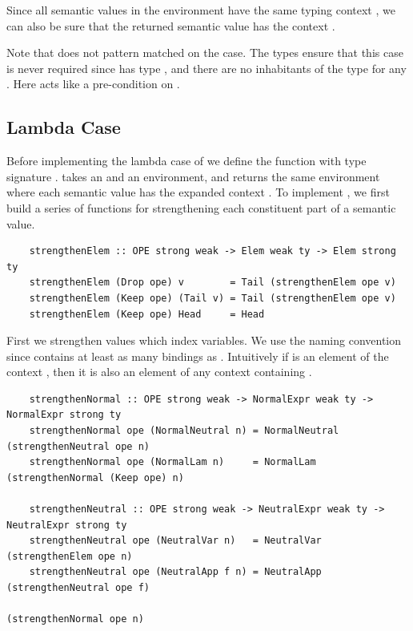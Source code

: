 Since all semantic values in the environment have the same typing context , we can also be sure that the returned semantic value has the context .

Note that  does not pattern matched on the  case. The types ensure that this case is never required since  has type , and there are no inhabitants of the type  for any . Here  acts like a pre-condition on .


\subsection{Lambda Case}
\label{subsect:typedEvalLamCase}

Before implementing the lambda case of  we define the function  with type signature .  takes an  and an environment, and returns the same environment where each semantic value has the expanded context . To implement , we first build a series of functions for strengthening each constituent part of a semantic value.

\begin{lstlisting}
    strengthenElem :: OPE strong weak -> Elem weak ty -> Elem strong ty
    strengthenElem (Drop ope) v        = Tail (strengthenElem ope v)
    strengthenElem (Keep ope) (Tail v) = Tail (strengthenElem ope v)
    strengthenElem (Keep ope) Head     = Head
\end{lstlisting}

First we strengthen  values which index variables. We use the naming convention  since  contains at least as many bindings as . 
Intuitively if  is an element of the context , then it is also an element of any context  containing .



\begin{lstlisting} 
    strengthenNormal :: OPE strong weak -> NormalExpr weak ty -> NormalExpr strong ty
    strengthenNormal ope (NormalNeutral n) = NormalNeutral (strengthenNeutral ope n)
    strengthenNormal ope (NormalLam n)     = NormalLam (strengthenNormal (Keep ope) n)

    strengthenNeutral :: OPE strong weak -> NeutralExpr weak ty -> NeutralExpr strong ty
    strengthenNeutral ope (NeutralVar n)   = NeutralVar (strengthenElem ope n)
    strengthenNeutral ope (NeutralApp f n) = NeutralApp (strengthenNeutral ope f) 
                                                        (strengthenNormal ope n) 

\end{lstlisting}

